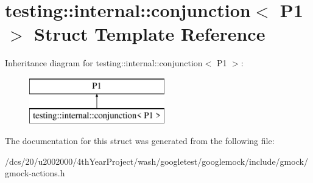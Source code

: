 \hypertarget{structtesting_1_1internal_1_1conjunction_3_01P1_01_4}{}\section{testing\+:\+:internal\+:\+:conjunction$<$ P1 $>$ Struct Template Reference}
\label{structtesting_1_1internal_1_1conjunction_3_01P1_01_4}
Inheritance diagram for testing\+:\+:internal\+:\+:conjunction$<$ P1 $>$\+:\begin{figure}[H]
\begin{center}
\leavevmode
\includegraphics[height=2.000000cm]{structtesting_1_1internal_1_1conjunction_3_01P1_01_4}
\end{center}
\end{figure}


The documentation for this struct was generated from the following file\+:\begin{DoxyCompactItemize}
\item 
/dcs/20/u2002000/4th\+Year\+Project/wash/googletest/googlemock/include/gmock/gmock-\/actions.\+h\end{DoxyCompactItemize}
